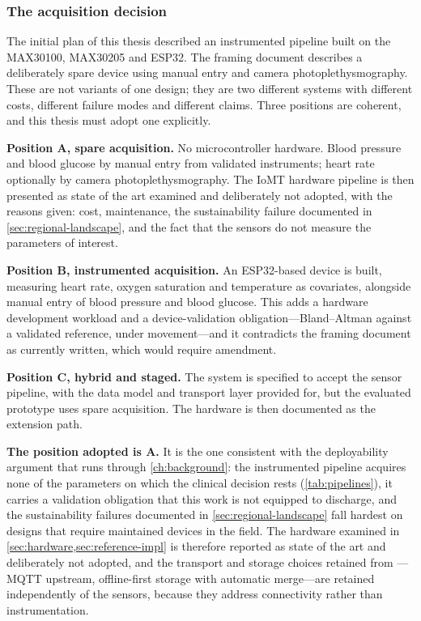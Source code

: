 \documentclass[12pt,a4paper,oneside]{report}
\begin{document}
\subsubsection{The acquisition decision}\label{sec:acq-decision}

The initial plan of this thesis described an instrumented pipeline built on the MAX30100, MAX30205 and ESP32. The framing document describes a deliberately spare device using manual entry and camera photoplethysmography. These are not variants of one design; they are two different systems with different costs, different failure modes and different claims. Three positions are coherent, and this thesis must adopt one explicitly.

\textbf{Position A, spare acquisition.} No microcontroller hardware. Blood pressure and blood glucose by manual entry from validated instruments; heart rate optionally by camera photoplethysmography. The IoMT hardware pipeline is then presented as state of the art examined and deliberately not adopted, with the reasons given: cost, maintenance, the sustainability failure documented in \cref{sec:regional-landscape}, and the fact that the sensors do not measure the parameters of interest.

\textbf{Position B, instrumented acquisition.} An ESP32-based device is built, measuring heart rate, oxygen saturation and temperature as covariates, alongside manual entry of blood pressure and blood glucose. This adds a hardware development workload and a device-validation obligation---Bland--Altman against a validated reference, under movement---and it contradicts the framing document as currently written, which would require amendment.

\textbf{Position C, hybrid and staged.} The system is specified to accept the sensor pipeline, with the data model and transport layer provided for, but the evaluated prototype uses spare acquisition. The hardware is then documented as the extension path.

\textbf{The position adopted is A.} It is the one consistent with the deployability argument that runs through \cref{ch:background}: the instrumented pipeline acquires none of the parameters on which the clinical decision rests (\cref{tab:pipelines}), it carries a validation obligation that this work is not equipped to discharge, and the sustainability failures documented in \cref{sec:regional-landscape} fall hardest on designs that require maintained devices in the field. The hardware examined in \cref{sec:hardware,sec:reference-impl} is therefore reported as state of the art and deliberately not adopted, and the transport and storage choices retained from \textcite{efendi2025}---MQTT upstream, offline-first storage with automatic merge---are retained independently of the sensors, because they address connectivity rather than instrumentation.
\end{document}
